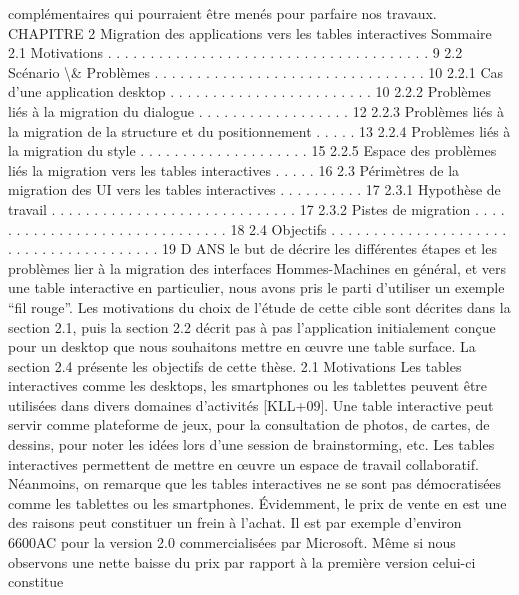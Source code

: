 \documentclass{article}
\begin{document}
compl\'{e}mentaires qui pourraient \^{e}tre men\'{e}s pour parfaire nos travaux.
CHAPITRE 2
Migration des applications vers les tables
interactives
Sommaire
2.1
Motivations . . . . . . . . . . . . . . . . . . . . . . . . . . . . . . . . . . . . . .
9
2.2
Sc\'{e}nario \textbackslash{}& Probl\`{e}mes . . . . . . . . . . . . . . . . . . . . . . . . . . . . . . . .
10
2.2.1
Cas d’une application desktop . . . . . . . . . . . . . . . . . . . . . . . .
10
2.2.2
Probl\`{e}mes li\'{e}s \`{a} la migration du dialogue . . . . . . . . . . . . . . . . . .
12
2.2.3
Probl\`{e}mes li\'{e}s \`{a} la migration de la structure et du positionnement . . . . .
13
2.2.4
Probl\`{e}mes li\'{e}s \`{a} la migration du style . . . . . . . . . . . . . . . . . . . .
15
2.2.5
Espace des probl\`{e}mes li\'{e}s la migration vers les tables interactives . . . . .
16
2.3
P\'{e}rim\`{e}tres de la migration des UI vers les tables interactives . . . . . . . . . .
17
2.3.1
Hypoth\`{e}se de travail . . . . . . . . . . . . . . . . . . . . . . . . . . . . .
17
2.3.2
Pistes de migration . . . . . . . . . . . . . . . . . . . . . . . . . . . . . .
18
2.4
Objectifs . . . . . . . . . . . . . . . . . . . . . . . . . . . . . . . . . . . . . . .
19
D
ANS le but de d\'{e}crire les diff\'{e}rentes \'{e}tapes et les probl\`{e}mes lier \`{a} la migration des interfaces
Hommes-Machines en g\'{e}n\'{e}ral, et vers une table interactive en particulier, nous avons pris le
parti d’utiliser un exemple “ﬁl rouge”. Les motivations du choix de l’\'{e}tude de cette cible sont d\'{e}crites
dans la section 2.1, puis la section 2.2 d\'{e}crit pas \`{a} pas l’application initialement con\c{c}ue pour un
desktop que nous souhaitons mettre en œuvre une table surface. La section 2.4 pr\'{e}sente les objectifs
de cette th\`{e}se.
2.1
Motivations
Les tables interactives comme les desktops, les smartphones ou les tablettes peuvent \^{e}tre utilis\'{e}es
dans divers domaines d’activit\'{e}s [KLL+09]. Une table interactive peut servir comme plateforme de
jeux, pour la consultation de photos, de cartes, de dessins, pour noter les id\'{e}es lors d’une session
de brainstorming, etc. Les tables interactives permettent de mettre en œuvre un espace de travail
collaboratif.
N\'{e}anmoins, on remarque que les tables interactives ne se sont pas d\'{e}mocratis\'{e}es comme les tablettes ou les smartphones. Évidemment, le prix de vente en est une des raisons peut constituer un
frein \`{a} l’achat. Il est par exemple d’environ 6600AC pour la version 2.0 commercialis\'{e}es par Microsoft.
M\^{e}me si nous observons une nette baisse du prix par rapport \`{a} la premi\`{e}re version celui-ci constitue
\end{document}
